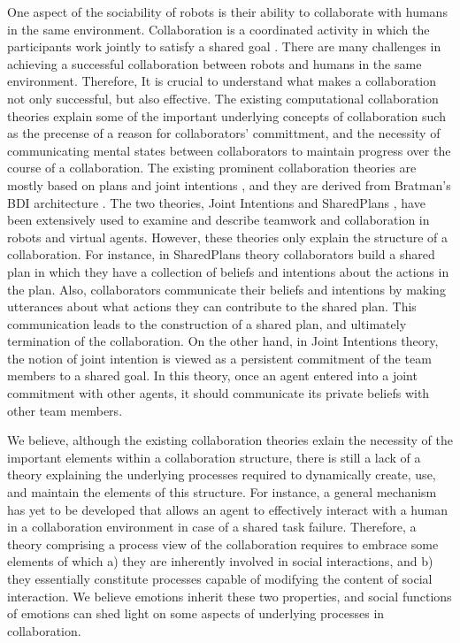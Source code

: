 One aspect of the sociability of robots is their ability to collaborate with
humans in the same environment. Collaboration is a coordinated activity in which
the participants work jointly to satisfy a shared goal
\cite{grosz:plans-discourse}. There are many challenges in achieving a
successful collaboration between robots and humans in the same environment.
Therefore, It is crucial to understand what makes a collaboration not only
successful, but also effective. The existing computational collaboration
theories explain some of the important underlying concepts of collaboration such
as the precense of a reason for collaborators' committment, and the necessity
of communicating mental states between collaborators to maintain progress over
the course of a collaboration. The existing prominent collaboration theories are
mostly based on plans and joint intentions \cite{cohen:teamwork}
\cite{grosz:plans-discourse} \cite{Litman:discourse-commonsense}, and they are
derived from Bratman's BDI architecture \cite{bratman:intentions-plans}. The two
theories, Joint Intentions \cite{cohen:teamwork} and SharedPlans
\cite{grosz:planning-acting,grosz:collaboration,grosz:plans-discourse}, have
been extensively used to examine and describe teamwork and collaboration in
robots and virtual agents. However, these theories only explain the structure of
a collaboration. For instance, in SharedPlans theory collaborators build a
shared plan in which they have a collection of beliefs and intentions about the
actions in the plan. Also, collaborators communicate their beliefs and
intentions by making utterances about what actions they can contribute to the
shared plan. This communication leads to the construction of a shared plan, and
ultimately termination of the collaboration. On the other hand, in Joint
Intentions theory, the notion of joint intention is viewed as a persistent
commitment of the team members to a shared goal. In this theory, once an agent
entered into a joint commitment with other agents, it should communicate its
private beliefs with other team members.

We believe, although the existing collaboration theories exlain the necessity of
the important elements within a collaboration structure, there is still a lack
of a theory explaining the underlying processes required to dynamically create,
use, and maintain the elements of this structure. For instance, a general
mechanism has yet to be developed that allows an agent to effectively interact
with a human in a collaboration environment in case of a shared task failure.
Therefore, a theory comprising a process view of the collaboration requires to
embrace some elements of which a) they are inherently involved in social
interactions, and b) they essentially constitute processes capable of modifying
the content of social interaction. We believe emotions inherit these two
properties, and social functions of emotions can shed light on some aspects of
underlying processes in collaboration.

